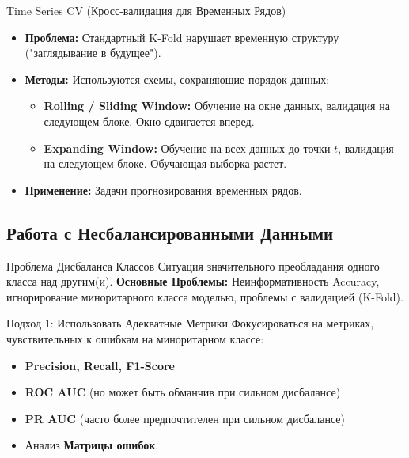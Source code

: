 \begin{myexampleblock}{{Time Series CV (Кросс-валидация для Временных Рядов)}}
    \begin{itemize}[nosep, leftmargin=*]
        \item \textbf{Проблема:} Стандартный K-Fold нарушает временную структуру ("заглядывание в будущее").
        \item \textbf{Методы:} Используются схемы, сохраняющие порядок данных:
            \begin{itemize}
                 \item \textbf{Rolling / Sliding Window:} Обучение на окне данных, валидация на следующем блоке. Окно сдвигается вперед.
                 \item \textbf{Expanding Window:} Обучение на всех данных до точки $t$, валидация на следующем блоке. Обучающая выборка растет.
            \end{itemize}
        \item \textbf{Применение:} Задачи прогнозирования временных рядов.
    \end{itemize}
\end{myexampleblock}

\subsection{Работа с Несбалансированными Данными}
\begin{myblock}{Проблема Дисбаланса Классов}
Ситуация значительного преобладания одного класса над другим(и).
\textbf{Основные Проблемы:} Неинформативность Accuracy, игнорирование миноритарного класса моделью, проблемы с валидацией (K-Fold).
\end{myblock}

\begin{myblock}{Подход 1: Использовать Адекватные Метрики}
Фокусироваться на метриках, чувствительных к ошибкам на миноритарном классе:
\begin{itemize}[nosep, leftmargin=*]
    \item \textbf{Precision, Recall, F1-Score}
    \item \textbf{ROC AUC} (но может быть обманчив при сильном дисбалансе)
    \item \textbf{PR AUC} (часто более предпочтителен при сильном дисбалансе)
    \item Анализ \textbf{Матрицы ошибок}.
\end{itemize}
\end{myblock}

